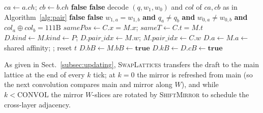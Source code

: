 \documentclass{ijuc}
\begin{document}
\begin{algorithm}[ht]
\caption{Blob formation, electric/magnetic channels, and collapse (superposing and distinct bubbles).}
\label{alg:blob}
\begin{algorithmic}[1]
  \State $ca \gets a.ch$; $cb \gets b.ch$
   
    \State \Return \textbf{false}
   
    \State \Return \textbf{false}
  \EndIf
  \State decode $(q,w_{1},w_{0})$ and $col$ of $ca,cb$ as in Algorithm~\ref{alg:pair}
   
    \State \Return \textbf{false}
   
    \State \Return \textbf{false}
  \EndIf
  \State \Return $w_{1,a} = w_{1,b}$ \textbf{and} $q_a \neq q_b$ \textbf{and} $w_{0,a} \neq w_{0,b}$ \textbf{and} $col_a \oplus col_b = 111\mathrm{B}$ 
\EndFunction
{}
  \State $samePos \gets C.x = M.x$; $sameT \gets C.t = M.t$
    \State $D.kind \gets M.kind \gets P$; $D.pair\_idx \gets M.w$; $M.pair\_idx \gets C.w$ 
    \State $D.a \gets M.a \gets$ shared affinity; ; reset $t$
      \State $D.bB \gets M.bB \gets \textbf{true}$ 
    \EndIf
   
     
      \State $D.kB \gets D.cB \gets \textbf{true}$ 
    \Else
      \State {} 
\EndIf
  \EndIf
\EndProcedure
\end{algorithmic}
\end{algorithm}

As given in Sect.~\ref{subsec:updating}, \textsc{SwapLattices} transfers the draft to the main lattice at the end of every $k$ tick; at $k=0$ the mirror is refreshed from main (so the next convolution compares main and mirror along $W$), and while $k<\mathrm{CONVOL}$ the mirror $W$-slices are rotated by \textsc{ShiftMirror} to schedule the cross-layer adjacency.
\end{document}

